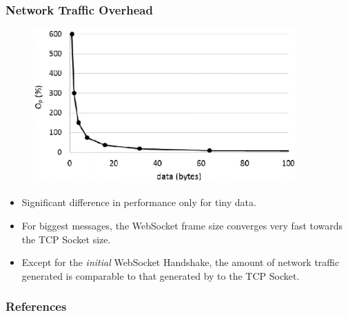 \documentclass{beamer}
\begin{document}
\begin{frame}
    \frametitle{Network Traffic Overhead}
    \begin{figure}
        \includegraphics[width=0.9\textwidth]{images/network_traffic_overhead.jpeg}
    \end{figure}
    \pause{}
    \begin{itemize}[<+->]
        \item \alert{Significant difference} in performance only for \alert{tiny data}.
        \item For \alert{biggest messages}, the WebSocket frame size \alert{converges very
                  fast} towards the TCP Socket size. 
        \item Except for the \textit{initial} WebSocket Handshake, \alert{the amount of
                  network traffic generated is comparable to that generated by to the TCP Socket.
                   }
    \end{itemize}
\end{frame}

\begin{frame}
    \nocite{*}
    \frametitle{References}
    
    
\end{frame}
\end{document}
